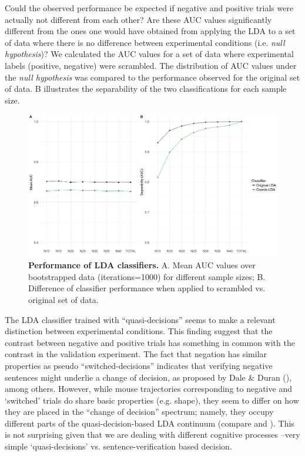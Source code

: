 \documentclass{article}
\begin{document}
Could the observed performance be expected if negative and positive trials were actually not different from each other? Are these AUC values significantly different from the ones one would have obtained from applying the LDA to a set of data where there is no difference between experimental conditions (i.e. \emph{null hypothesis})? We calculated the AUC values for a set of data where experimental labels (positive, negative) were scrambled. The distribution of AUC values under the \emph{null hypothesis} was compared to the performance observed for the original set of data. B illustrates the separability of the two classifications for each sample size.

\begin{figure}
\centering
\includegraphics[width=\textwidth]{auc_permutation_negation_1.png}
\caption{\textbf{Performance of LDA classifiers.} A. Mean AUC values over bootstrapped data (iterations=1000) for different sample sizes;  B. Difference of classifier performance when applied to scrambled vs. original set of data.}
\label{fig:permutation_AUC_negation}
\end{figure}


The LDA classifier trained with ``quasi-decisions'' seems to make a relevant distinction between experimental conditions. This finding suggest that the contrast between negative and positive trials has something in common with the contrast in the validation experiment. The fact that negation has similar properties as pseudo “switched-decisions'' indicates that verifying negative sentences might underlie a change of decision, as proposed by Dale \& Duran (\citeyear{Dale2011}), among others.  
However, while mouse trajectories corresponding to negative and `switched' trials do share basic properties (e.g. shape), they seem to differ on how they are placed in the “change of decision” spectrum; namely, they occupy different parts of the quasi-decision-based LDA continuum (compare  and ). This is not surprising given that we are dealing with different cognitive processes --very simple `quasi-decisions' vs. sentence-verification based decision. 
\end{document}
